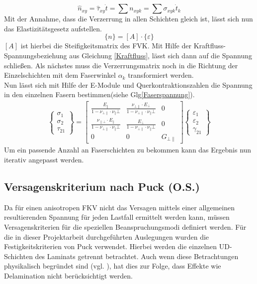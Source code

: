 \begin{equation}
\hat{n}_{xy}=\hat{\tau}_{xy}\dot t=\sum n_{xyk}=\sum\sigma_{xyk}\dot t_{k}
\end{equation}
Mit der Annahme, dass die Verzerrung in allen Schichten gleich ist, lässt sich nun das Elastizitätsgesetz aufstellen.
\begin{equation}
\lbrace n\rbrace= [A]\cdot \lbrace\varepsilon\rbrace
\end{equation}
$[A]$ ist hierbei die Steifigkeitsmatrix des FVK. Mit Hilfe der Kraftfluss- Spannungsbeziehung aus Gleichung \ref{Kraftfluss}, lässt sich dann auf die Spannung schließen.
Als nächstes muss die Verzerrungsmatrix noch in die Richtung der Einzelschichten mit dem Faserwinkel $\alpha_{k}$ transformiert werden.\\
Nun lässt sich mit Hilfe der E-Module und Querkontraktionszahlen die Spannung in den einzelnen Fasern bestimmen(siehe Glg\ref{Faserspannung}).
\begin{gather}
\label{Faserspannung}
\begin{Bmatrix}
\sigma_{1}\\
\sigma_{2}\\
\tau_{21}
\end{Bmatrix}
=
\begin{bmatrix}
\frac{E_{\|}}{1-\nu_{\bot\|}\cdot \nu_{\|}\bot}&\frac{\nu_{\bot\|}\cdot E_{\bot}}{1-\nu_{\bot\|}\cdot \nu_{\|}\bot}&0\\
\frac{\nu_{\|\bot}\cdot E_{\|}}{1-\nu_{\bot\|}\cdot \nu_{\|}\bot}&\frac{E_{\bot}}{1-\nu_{\bot\|}\cdot \nu_{\|}\bot}&0\\
0&0&G_{\bot\|}
\end{bmatrix}
\begin{Bmatrix}
\varepsilon_{1}\\
\varepsilon_{2}\\
\gamma_{21}
\end{Bmatrix}
\end{gather}
Um ein passende Anzahl an Faserschichten zu bekommen kann das Ergebnis nun iterativ angepasst werden.\cite{item3}
\subsection{Versagenskriterium nach Puck (O.S.)}
Da für einen anisotropen FKV nicht das Versagen mittels einer allgemeinen resultierenden Spannung für jeden Lastfall ermittelt werden kann, müssen Versagenskriterien für die speziellen Beanspruchungsmodi definiert werden. Für die in dieser Projektarbeit durchgeführten Auslegungen wurden die Festigkeitskriterien von Puck verwendet. Hierbei werden die einzelnen UD-Schichten des Laminats getrennt betrachtet. Auch wenn diese Betrachtungen physikalisch begründet sind (vgl. \cite{EdL}), hat dies zur Folge, dass Effekte wie Delamination nicht berücksichtigt werden.
